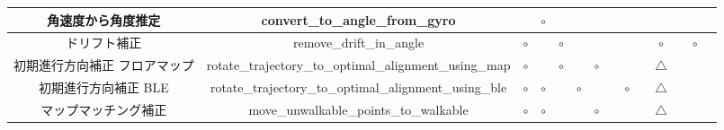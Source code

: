 \begin{table}[ht]
{\begin{tabular}{|c|c|c|c|c|c|c|c|c|c|c|c|c|c|}
			角速度から角度推定       & convert\_to\_angle\_from\_gyro                                      &                              & \multicolumn{1}{c|}{$\circ$} &                              &                              &                              &                                                                                                               &                              &                           &                                  &    &                              &    \\ \hline
			ドリフト補正          & remove\_drift\_in\_angle                                            & \multicolumn{1}{c|}{$\circ$} &                              & \multicolumn{1}{c|}{$\circ$} &                              &                              &                                                                                                               &                              &                           & \multicolumn{1}{c|}{$\circ$}     &    & \multicolumn{1}{c|}{$\circ$} &    \\ \hline
			初期進行方向補正 フロアマップ & rotate\_trajectory\_to\_optimal\_alignment\_using\_map              & \multicolumn{1}{c|}{$\circ$} &                              & \multicolumn{1}{c|}{$\circ$} &                              & \multicolumn{1}{c|}{$\circ$} &                                                                                                               &                              &                           & \multicolumn{1}{c|}{$\triangle$} &    &                              &    \\ \hline
			初期進行方向補正 BLE    & rotate\_trajectory\_to\_optimal\_alignment\_using\_ble              & \multicolumn{1}{c|}{$\circ$} & \multicolumn{1}{c|}{$\circ$} &                              & \multicolumn{1}{c|}{$\circ$} &                              &                                                                                                               & \multicolumn{1}{c|}{$\circ$} &                           & \multicolumn{1}{c|}{$\triangle$} &    &                              &    \\ \hline
			マップマッチング補正      & move\_unwalkable\_points\_to\_walkable                              & \multicolumn{1}{c|}{$\circ$} & \multicolumn{1}{c|}{$\circ$} &                              &                              & \multicolumn{1}{c|}{$\circ$} &                                                                                                               &                              &                           &  \multicolumn{1}{c|}{$\triangle$}                                 &    &                              &    \\ \hline

\end{tabular}}
\end{table}
